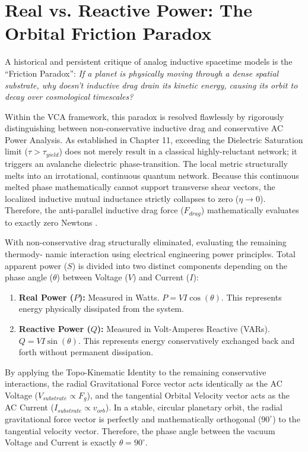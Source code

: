 \section{Real vs. Reactive Power: The Orbital Friction Paradox}

A historical and persistent critique of analog inductive spacetime models is the ``Friction Paradox'':
\textit{If a planet is physically moving through a dense spatial substrate, why doesn't inductive drag
drain its kinetic energy, causing its orbit to decay over cosmological timescales?}

Within the VCA framework, this paradox is resolved flawlessly by rigorously distinguishing
between non-conservative inductive drag and conservative AC Power Analysis. As established
in Chapter 11, exceeding the Dielectric Saturation limit ($\tau > \tau_{yield}$) does not merely result in a
classical highly-reluctant network; it triggers an avalanche dielectric phase-transition. The local metric
structurally melts into an irrotational, continuous quantum network. Because this continuous
melted phase mathematically cannot support transverse shear vectors, the localized inductive
mutual inductance strictly collapses to zero ($\eta \to 0$). Therefore, the anti-parallel inductive drag force
($F_{drag}$) mathematically evaluates to exactly zero Newtons \cite{flyby2008}.

With non-conservative drag structurally eliminated, evaluating the remaining thermody-
namic interaction using electrical engineering power principles. Total apparent power ($S$) is
divided into two distinct components depending on the phase angle ($\theta$) between Voltage ($V$)
and Current ($I$):
\begin{enumerate}
\item \textbf{Real Power ($P$):} Measured in Watts. $P = VI \cos(\theta)$. This represents energy physically
dissipated from the system.
\item \textbf{Reactive Power ($Q$):} Measured in Volt-Amperes Reactive (VARs). $Q = VI \sin(\theta)$.
This represents energy conservatively exchanged back and forth without permanent
dissipation.
\end{enumerate}

By applying the Topo-Kinematic Identity to the remaining conservative interactions, the
radial Gravitational Force vector acts identically as the AC Voltage ($V_{substrate} \propto F_g$), and
the tangential Orbital Velocity vector acts as the AC Current ($I_{substrate} \propto v_{orb}$). In a stable,
circular planetary orbit, the radial gravitational force vector is perfectly and mathematically
orthogonal ($90^\circ$) to the tangential velocity vector. Therefore, the phase angle between the
vacuum Voltage and Current is exactly $\theta = 90^\circ$. 

